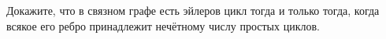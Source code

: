 Докажите, что в связном графе есть эйлеров цикл тогда и только тогда, когда всякое его ребро принадлежит
нечётному числу простых циклов.
